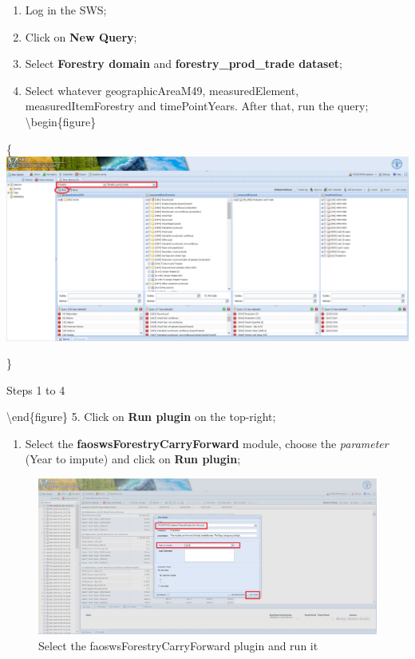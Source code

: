 \documentclass[
]{book}
\providecommand{\tightlist}{%
  \setlength{\itemsep}{0pt}\setlength{\parskip}{0pt}}
\begin{document}
\begin{enumerate}
\def\labelenumi{\arabic{enumi}.}
\item
  Log in the SWS;
\item
  Click on \textbf{New Query};
\item
  Select \textbf{Forestry domain} and \textbf{forestry\_prod\_trade dataset};
\item
  Select whatever geographicAreaM49, measuredElement, measuredItemForestry and timePointYears. After that, run the query;
  \textbackslash begin\{figure\}
\end{enumerate}

\{\centering \includegraphics[width=1\linewidth]{images/query_forestry_unece_itto_input_data_plugin}

\}

\caption{Steps 1 to 4}

\label{fig:queryCarryForward}
\textbackslash end\{figure\}
5. Click on \textbf{Run plugin} on the top-right;

\begin{enumerate}
\def\labelenumi{\arabic{enumi}.}
\setcounter{enumi}{5}
\tightlist
\item
  Select the \textbf{faoswsForestryCarryForward} module, choose the \emph{parameter} (Year to impute) and click on \textbf{Run plugin};
\end{enumerate}

\begin{figure}

{\centering \includegraphics[width=1\linewidth]{images/carry_forward_plugin} 

}

\caption{Select the faoswsForestryCarryForward plugin and run it}\label{fig:CarryForwardPlugin}
\end{figure}
\end{document}
